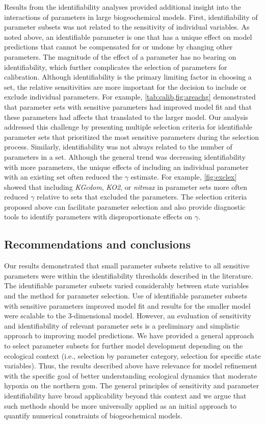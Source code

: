 \documentclass[review]{elsarticle}\usepackage[]{graphicx}\usepackage[]{color}
\begin{document}
Results from the identifiability analyses provided additional insight into the interactions of parameters in large biogeochemical models.  First, identifiability of parameter subsets was not related to the sensitivity of individual variables. As noted above, an identifiable parameter is one that has a unique effect on model predictions that cannot be compensated for or undone by changing other parameters. The magnitude of the effect of a parameter has no bearing on identifiability, which further complicates the selection of parameters for calibration.  Although identifiability is the primary limiting factor in choosing a set, the relative sensitivities are more important for the decision to include or exclude individual parameters.  For example, \cref{tab:calib,fig:areachg} demonstrated that parameter sets with sensitive parameters had improved model fit and that these parameters had affects that translated to the larger model. Our analysis addressed this challenge by presenting multiple selection criteria for identifiable parameter sets that prioritized the most sensitive parameters during the selection process.  Similarly, identifiability was not always related to the number of parameters in a set. Although the general trend was decreasing identifiability with more parameters, the unique effects of including an individual parameter with an existing set often reduced the $\gamma$ estimate. For example, \cref{fig:exclex} showed that including \textit{KGcdom}, \textit{KO2}, or \textit{nitmax} in parameter sets more often reduced $\gamma$ relative to sets that excluded the parameters.  The selection criteria proposed above can facilitate parameter selection and also provide diagnostic tools to identify parameters with disproportionate effects on $\gamma$.

\subsection{Recommendations and conclusions}

Our results demonstrated that small parameter subsets relative to all sensitive parameters were within the identifiability thresholds described in the literature.  The identifiable parameter subsets varied considerably between state variables and the method for parameter selection.  Use of identifiable parameter subsets with sensitive parameters improved model fit and results for the smaller model were scalable to the 3-dimensional model.  However, an evaluation of sensitivity and identifiability of relevant parameter sets is a preliminary and simplistic approach to improving model predictions.  We have provided a general approach to select parameter subsets for further model development depending on the ecological context (i.e., selection by parameter category, selection for specific state variables). Thus, the results described above have relevance for model refinement with the specific goal of better understanding ecological dynamics that moderate hypoxia on the northern \ac{gom}.  The general principles of sensitivity and parameter identifiability have broad applicability beyond this context and we argue that such methods should be more universally applied as an initial approach to quantify numerical constraints of biogeochemical models.  
\end{document}
